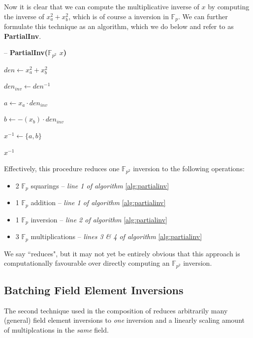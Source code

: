 Now it is clear that we can compute the multiplicative inverse of $x$ by computing the inverse of $x_{a}^2 + x_{b}^2$, which is of course a inversion in $\mathbb{F}_{p}$. We can further formulate this technique as an algorithm,  which we do below and refer to as \textbf{PartialInv}.

\begin{algorithm}
\caption{-- \textbf{PartialInv($\mathbb{F}_{p^{2}}$ $x$)}}\label{alg:partialinv}
\begin{algorithmic}[1]
\State $den \gets x_{a}^{2} + x_{b}^{2}$

\State $den_{inv} \gets den^{-1}$

\State $a \gets x_{a} \cdot den_{inv}$

\State $b \gets -(x_{b}) \cdot den_{inv}$

\State $x^{-1} \gets \{a, b\}$

\State \Return $x^{-1}$
\end{algorithmic}
\end{algorithm}

Effectively, this procedure reduces one $\mathbb{F}_{p^{2}}$ inversion to the following operations: 

\begin{center}
\begin{itemize}
\item 2 $\mathbb{F}_{p}$ squarings -- \emph{line 1 of algorithm} \ref{alg:partialinv}
\item 1 $\mathbb{F}_{p}$ addition -- \emph{line 1 of algorithm} \ref{alg:partialinv}
\item 1 $\mathbb{F}_{p}$ inversion -- \emph{line 2 of algorithm} \ref{alg:partialinv}
\item 3 $\mathbb{F}_{p}$ multiplications -- \emph{lines 3 \& 4 of algorithm} \ref{alg:partialinv}
\end{itemize}
\end{center}

We say ``reduces", but it may not yet be entirely obvious that this approach is computationally favourable over directly computing an $\mathbb{F}_{p^{2}}$ inversion. 

\subsection{Batching Field Element Inversions}

The second technique used in the composition of  reduces arbitrarily many (general) field element inversions to \emph{one} inversion and a linearly scaling amount of multiplcations in the \emph{same} field.

